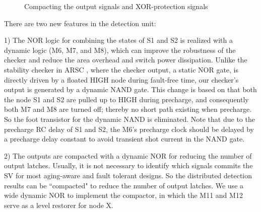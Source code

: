 \begin{figure}[t]
\centering {}
\hspace{1cm}   \caption{Compacting the
output signals and XOR-protection signals} \label{compactor}
\end{figure}


There are two new features in the detection unit:

1) The NOR logic for combining the states of S1 and S2 is realized with a dynamic
logic (M6, M7, and M8), which can improve the robustness of the checker and reduce
the area overhead and switch power dissipation. Unlike the stability checker in ARSC
\cite{failure_prediction_07}, where the checker output, a static NOR gate, is
directly driven by a floated HIGH node during fault-free time, our checker's output
is generated by a dynamic NAND gate. This change is based on that both the node S1
and S2 are pulled up to HIGH during precharge, and consequently both M7 and M8 are
turned off; thereby no short path existing when precharge. So the foot transistor
for the dynamic NAND is eliminated. Note that due to the precharge RC delay of S1
and S2, the M6's precharge clock should be delayed by a precharge delay constant to
avoid transient shot current in the NAND gate.

2) The outputs are compacted with a dynamic NOR for reducing the number of output
latches. Usually, it is not necessary to identify which signals commits the SV for
most aging-aware and fault tolerant designs. So the distributed detection results
can be ``compacted" to reduce the number of output latches. We use a wide dynamic
NOR to implement the compactor, in which the M11 and M12 serve as a level restorer
for node X.




